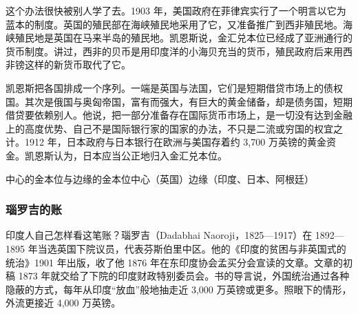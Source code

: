 这个办法很快被别人学了去。1903 年，美国政府在菲律宾实行了一个明言以它为蓝本的制度\cite{keynes1913}。英国的殖民部在海峡殖民地采用了它，又准备推广到西非殖民地\cite{keynes1913}。海峡殖民地是英国在马来半岛的殖民地。凯恩斯说，金汇兑本位已经成了亚洲通行的货币制度\cite{keynes1913}。讲过，西非的贝币是用印度洋的小海贝充当的货币，殖民政府后来用西非镑这样的新货币取代了它。

凯恩斯把各国排成一个序列。一端是英国与法国，它们是短期借贷市场上的债权国\cite{keynes1913}。其次是俄国与奥匈帝国，富有而强大，有巨大的黄金储备，却是债务国，短期借贷要依赖别人\cite{keynes1913}。他说，把一部分准备存在国际货币市场上，是一切没有达到金融上的高度优势、自己不是国际银行家的国家的办法，不只是二流或穷国的权宜之计\cite{keynes1913}。1912 年，日本政府与日本银行在欧洲与美国存着约 3,700 万英镑的黄金资金\cite{keynes1913}。凯恩斯认为，日本应当公正地归入金汇兑本位\cite{keynes1913}。

\begin{compare}{中心的金本位与边缘的金本位}{中心（英国）}{边缘（印度、日本、阿根廷）}
\end{compare}

\subsubsection{瑙罗吉的账}
印度人自己怎样看这笔账？瑙罗吉（Dadabhai Naoroji，1825—1917）在 1892—1895 年当选英国下院议员，代表芬斯伯里中区\cite{hansardpeople24}。他的《印度的贫困与非英国式的统治》1901 年出版，收了他 1876 年在东印度协会孟买分会宣读的文章\cite{naoroji1901}。文章的初稿 1873 年就交给了下院的印度财政特别委员会\cite{naoroji1901}。书的导言说，外国统治通过各种隐蔽的方式，每年从印度“放血”般地抽走近 3,000 万英镑或更多\cite{naoroji1901}。照眼下的情形，外流更接近 4,000 万英镑\cite{naoroji1901}。

